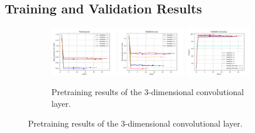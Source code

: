 \documentclass[./main.tex]{subfiles}
\begin{document}
\subsection{Training and Validation Results}
\label{subsec:pretrain_train_val_res}
\begin{figure}[htbp]
    \centering
     \begin{subfigure}[b]{\textwidth}
         \centering
         \includegraphics[width=0.32\textwidth]{./entities/pretrained/baseline/train_losses.png}
         \includegraphics[width=0.32\textwidth]{./entities/pretrained/baseline/val_losses.png}
         \includegraphics[width=0.32\textwidth]{./entities/pretrained/baseline/val_accs.png}
         \caption{Pretraining results of the 3-dimensional convolutional layer.}
     \end{subfigure}
    \hfill


\end{figure}
\end{document}
